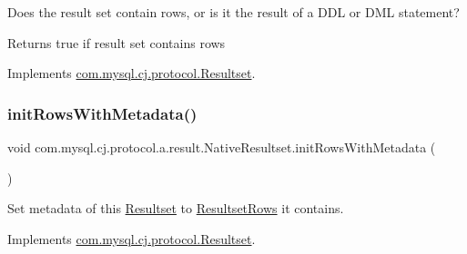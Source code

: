 Does the result set contain rows, or is it the result of a D\+DL or D\+ML statement?

\begin{DoxyReturn}{Returns}
true if result set contains rows 
\end{DoxyReturn}


Implements \mbox{\hyperlink{interfacecom_1_1mysql_1_1cj_1_1protocol_1_1_resultset_acafe4b216e2086884d0758c64fd34c0b}{com.\+mysql.\+cj.\+protocol.\+Resultset}}.

\mbox{\label{classcom_1_1mysql_1_1cj_1_1protocol_1_1a_1_1result_1_1_native_resultset_a55681e1e25bdf8a26e098f812979bec3}} 
\subsubsection{\texorpdfstring{init\+Rows\+With\+Metadata()}{initRowsWithMetadata()}}
{\footnotesize\ttfamily void com.\+mysql.\+cj.\+protocol.\+a.\+result.\+Native\+Resultset.\+init\+Rows\+With\+Metadata (\begin{DoxyParamCaption}{ }\end{DoxyParamCaption})}

Set metadata of this \mbox{\hyperlink{interfacecom_1_1mysql_1_1cj_1_1protocol_1_1_resultset}{Resultset}} to \mbox{\hyperlink{interfacecom_1_1mysql_1_1cj_1_1protocol_1_1_resultset_rows}{Resultset\+Rows}} it contains. 

Implements \mbox{\hyperlink{interfacecom_1_1mysql_1_1cj_1_1protocol_1_1_resultset_a2ee6b6a8cb5164dfc293b23cefb96b46}{com.\+mysql.\+cj.\+protocol.\+Resultset}}.

\mbox{\label{classcom_1_1mysql_1_1cj_1_1protocol_1_1a_1_1result_1_1_native_resultset_a103a093ccb3cf34125ff020ddc9ad6d8}} 
